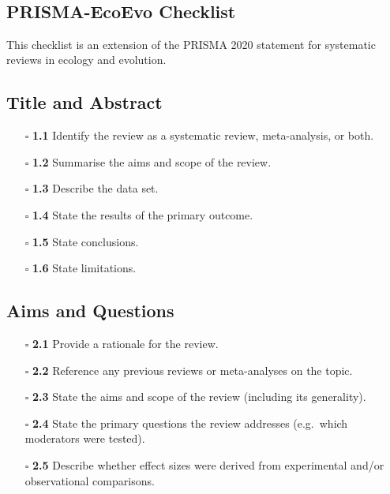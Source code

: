 \documentclass[11pt]{article}
\def\tightlist{}
\begin{document}
\begin{center}
{\LARGE }\\[4pt]
\normalsize 
\end{center}
\vspace{1em}

\begin{Form}

\section{PRISMA-EcoEvo Checklist}\label{prisma-ecoevo-checklist}

This checklist is an extension of the PRISMA 2020 statement for
systematic reviews in ecology and evolution.

\subsection{Title and Abstract}\label{title-and-abstract}

\begin{itemize}
\tightlist
\item[$\square$]
  \textbf{1.1} Identify the review as a systematic review,
  meta-analysis, or both.
\item[$\square$]
  \textbf{1.2} Summarise the aims and scope of the review.
\item[$\square$]
  \textbf{1.3} Describe the data set.
\item[$\square$]
  \textbf{1.4} State the results of the primary outcome.
\item[$\square$]
  \textbf{1.5} State conclusions.
\item[$\square$]
  \textbf{1.6} State limitations.
\end{itemize}

\subsection{Aims and Questions}\label{aims-and-questions}

\begin{itemize}
\tightlist
\item[$\square$]
  \textbf{2.1} Provide a rationale for the review.
\item[$\square$]
  \textbf{2.2} Reference any previous reviews or meta-analyses on the
  topic.
\item[$\square$]
  \textbf{2.3} State the aims and scope of the review (including its
  generality).
\item[$\square$]
  \textbf{2.4} State the primary questions the review addresses
  (e.g.~which moderators were tested).
\item[$\square$]
  \textbf{2.5} Describe whether effect sizes were derived from
  experimental and/or observational comparisons.
\end{itemize}


\end{Form}
\end{document}
